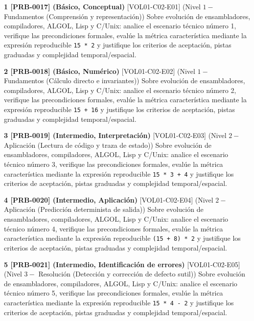 \documentclass{book}
\begin{document}
\begin{tcolorbox}[title={Ejercicios}, studiumworked, breakable]

\noindent\textbf{1 [PRB-0017] (Básico, Conceptual)}
[VOL01-C02-E01] (Nivel \(1 -\) Fundamentos (Comprensión y representación)) Sobre evolución de ensambladores, compiladores, ALGOL, Lisp y C/Unix: analice el escenario técnico número 1, verifique las precondiciones formales, evalúe la métrica característica mediante la expresión reproducible \texttt{15 * 2} y justifique los criterios de aceptación, pistas graduadas y complejidad temporal/espacial.

\noindent\textbf{2 [PRB-0018] (Básico, Numérico)}
[VOL01-C02-E02] (Nivel \(1 -\) Fundamentos (Cálculo directo e invariantes)) Sobre evolución de ensambladores, compiladores, ALGOL, Lisp y C/Unix: analice el escenario técnico número 2, verifique las precondiciones formales, evalúe la métrica característica mediante la expresión reproducible \texttt{15 + 16} y justifique los criterios de aceptación, pistas graduadas y complejidad temporal/espacial.

\noindent\textbf{3 [PRB-0019] (Intermedio, Interpretación)}
[VOL01-C02-E03] (Nivel \(2 -\) Aplicación (Lectura de código y traza de estado)) Sobre evolución de ensambladores, compiladores, ALGOL, Lisp y C/Unix: analice el escenario técnico número 3, verifique las precondiciones formales, evalúe la métrica característica mediante la expresión reproducible \texttt{15 * 3 + 4} y justifique los criterios de aceptación, pistas graduadas y complejidad temporal/espacial.

\noindent\textbf{4 [PRB-0020] (Intermedio, Aplicación)}
[VOL01-C02-E04] (Nivel \(2 -\) Aplicación (Predicción determinista de salida)) Sobre evolución de ensambladores, compiladores, ALGOL, Lisp y C/Unix: analice el escenario técnico número 4, verifique las precondiciones formales, evalúe la métrica característica mediante la expresión reproducible \texttt{(15 + 8) * 2} y justifique los criterios de aceptación, pistas graduadas y complejidad temporal/espacial.

\noindent\textbf{5 [PRB-0021] (Intermedio, Identificación de errores)}
[VOL01-C02-E05] (Nivel \(3 -\) Resolución (Detección y corrección de defecto sutil)) Sobre evolución de ensambladores, compiladores, ALGOL, Lisp y C/Unix: analice el escenario técnico número 5, verifique las precondiciones formales, evalúe la métrica característica mediante la expresión reproducible \texttt{15 * 4 - 2} y justifique los criterios de aceptación, pistas graduadas y complejidad temporal/espacial.


\end{tcolorbox}
\end{document}
